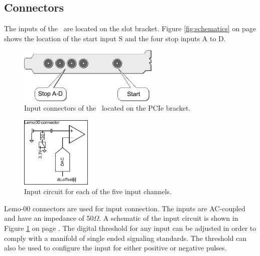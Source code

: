 	\subsection{Connectors}
	The inputs of the \deviceName\ are located on the slot bracket. Figure \ref{fig:schematics} on page \pageref{fig:schematics} shows the location of the start input S and the four stop inputs A to D.
%
	\begin{figure}[hb]
		\begin{center}
			\includegraphics[width=0.6\textwidth]{figures/xTDC4_Slotblende.pdf}
			\caption{Input connectors of the \deviceName\ located on the PCIe bracket.}
		\end{center}
	\end{figure}
		\begin{figure}[hb]
			\begin{center}
				\includegraphics[width=0.3\textwidth]{figures/InputCircuit.pdf}
				\caption{Input circuit for each of the five input channels.\label{fig:inputcirc}}
			\end{center}
		\end{figure}
	Lemo-00 connectors are used for input connection. The inputs are AC-coupled and have an impedance of 50$\Omega$. 
	A schematic of the input circuit is shown in Figure \ref{fig:inputcirc} on page \pageref{fig:inputcirc}. 
	The digital threshold for any input can be adjusted in order to comply with a manifold of single ended signaling standards.
	The threshold can also be used to configure the input for either positive or negative pulses.
	
